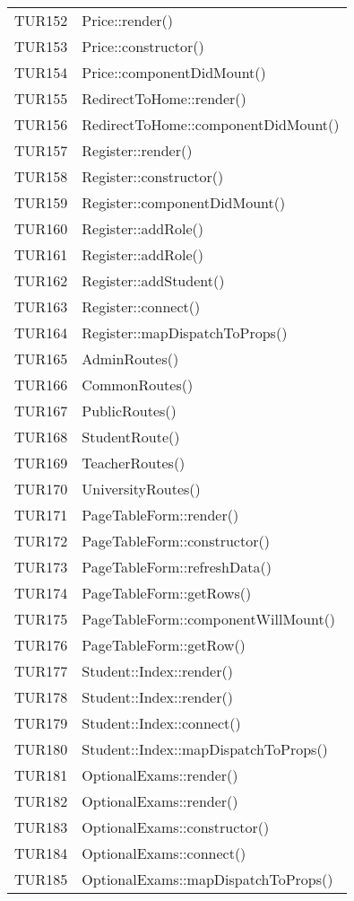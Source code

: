\documentclass[PianoDiQualifica.tex]{subfiles}
\begin{document}
\begin{longtable}[H]{P{5cm}P{9cm}}
	TUR152 & Price::render() \\ 
	TUR153 & Price::constructor() \\ 
	TUR154 & Price::componentDidMount() \\ 
	TUR155 & RedirectToHome::render() \\ 
	TUR156 & RedirectToHome::componentDidMount() \\ 
	TUR157 & Register::render() \\ 
	TUR158 & Register::constructor() \\ 
	TUR159 & Register::componentDidMount() \\ 
	TUR160 & Register::addRole() \\ 
	TUR161 & Register::addRole() \\ 
	TUR162 & Register::addStudent() \\ 
	TUR163 & Register::connect() \\ 
	TUR164 & Register::mapDispatchToProps() \\ 
	TUR165 & AdminRoutes() \\ 
	TUR166 & CommonRoutes() \\ 
	TUR167 & PublicRoutes() \\ 
	TUR168 & StudentRoute() \\ 
	TUR169 & TeacherRoutes() \\ 
	TUR170 & UniversityRoutes() \\ 
	TUR171 & PageTableForm::render() \\ 
	TUR172 & PageTableForm::constructor() \\ 
	TUR173 & PageTableForm::refreshData() \\ 
	TUR174 & PageTableForm::getRows() \\ 
	TUR175 & PageTableForm::componentWillMount() \\ 
	TUR176 & PageTableForm::getRow() \\
	TUR177 & Student::Index::render() \\
	TUR178 & Student::Index::render() \\
	TUR179 & Student::Index::connect() \\
	TUR180 & Student::Index::mapDispatchToProps() \\
	TUR181 & OptionalExams::render() \\
	TUR182 & OptionalExams::render() \\
	TUR183 & OptionalExams::constructor() \\
	TUR184 & OptionalExams::connect() \\
	TUR185 & OptionalExams::mapDispatchToProps() \\

\end{longtable}
\end{document}
